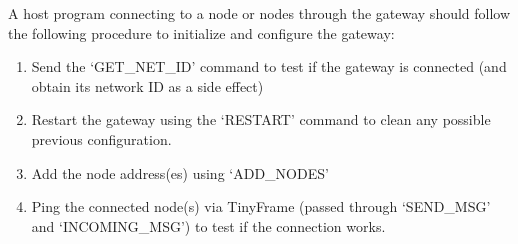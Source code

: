A host program connecting to a node or nodes through the gateway should follow the following procedure to initialize and configure the gateway:

\begin{enumerate}
	\item Send the `GET\_NET\_ID' command to test if the gateway is connected (and obtain its network ID as a side effect)
	\item Restart the gateway using the `RESTART' command to clean any possible previous configuration.
	\item Add the node address(es) using `ADD\_NODES'
	\item Ping the connected node(s) via TinyFrame (passed through `SEND\_MSG' and `INCOMING\_MSG') to test if the connection works.
\end{enumerate}






























